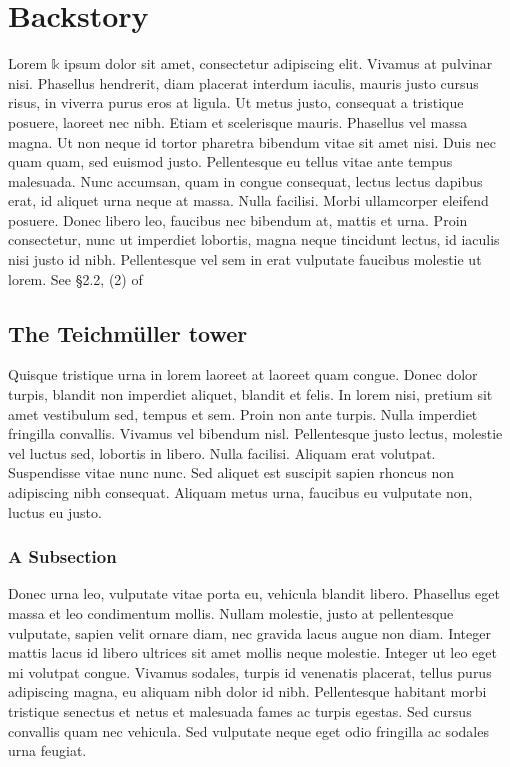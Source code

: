 \chapter{Backstory}
Lorem $\mathbb{k}$ ipsum dolor sit amet, consectetur adipiscing elit. Vivamus at pulvinar nisi. Phasellus hendrerit, diam placerat interdum iaculis, mauris justo cursus risus, in viverra purus eros at ligula. Ut metus justo, consequat a tristique posuere, laoreet nec nibh. Etiam et scelerisque mauris. Phasellus vel massa magna. Ut non neque id tortor pharetra bibendum vitae sit amet nisi. Duis nec quam quam, sed euismod justo. Pellentesque eu tellus vitae ante tempus malesuada. Nunc accumsan, quam in congue consequat, lectus lectus dapibus erat, id aliquet urna neque at massa. Nulla facilisi. Morbi ullamcorper eleifend posuere. Donec libero leo, faucibus nec bibendum at, mattis et urna. Proin consectetur, nunc ut imperdiet lobortis, magna neque tincidunt lectus, id iaculis nisi justo id nibh. Pellentesque vel sem in erat vulputate faucibus molestie ut lorem.
See \S2.2, (2) of \cite{schneps_grothendieck-teichmuller_1997}
\section{The Teichm\"uller tower}

Quisque tristique urna in lorem laoreet at laoreet quam congue. Donec dolor turpis, blandit non imperdiet aliquet, blandit et felis. In lorem nisi, pretium sit amet vestibulum sed, tempus et sem. Proin non ante turpis. Nulla imperdiet fringilla convallis. Vivamus vel bibendum nisl. Pellentesque justo lectus, molestie vel luctus sed, lobortis in libero. Nulla facilisi. Aliquam erat volutpat. Suspendisse vitae nunc nunc. Sed aliquet est suscipit sapien rhoncus non adipiscing nibh consequat. Aliquam metus urna, faucibus eu vulputate non, luctus eu justo.

\subsection{A Subsection}

Donec urna leo, vulputate vitae porta eu, vehicula blandit libero. Phasellus eget massa et leo condimentum mollis. Nullam molestie, justo at pellentesque vulputate, sapien velit ornare diam, nec gravida lacus augue non diam. Integer mattis lacus id libero ultrices sit amet mollis neque molestie. Integer ut leo eget mi volutpat congue. Vivamus sodales, turpis id venenatis placerat, tellus purus adipiscing magna, eu aliquam nibh dolor id nibh. Pellentesque habitant morbi tristique senectus et netus et malesuada fames ac turpis egestas. Sed cursus convallis quam nec vehicula. Sed vulputate neque eget odio fringilla ac sodales urna feugiat.

